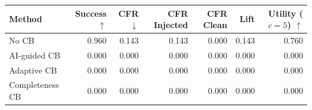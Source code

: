 \begin{tabular}{lrrrrrr}
\toprule
Method & Success $\uparrow$ & CFR $\downarrow$ & CFR Injected & CFR Clean & Lift & Utility ($c=5$) $\uparrow$ \\
\midrule
No CB & 0.960 & 0.143 & 0.143 & 0.000 & 0.143 & 0.760 \\
AI-guided CB & 0.000 & 0.000 & 0.000 & 0.000 & 0.000 & 0.000 \\
Adaptive CB & 0.000 & 0.000 & 0.000 & 0.000 & 0.000 & 0.000 \\
Completeness CB & 0.000 & 0.000 & 0.000 & 0.000 & 0.000 & 0.000 \\
\bottomrule
\end{tabular}
